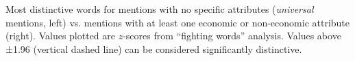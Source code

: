 Most distinctive words for mentions with no specific attributes (\emph{universal} mentions, left) vs. mentions with at least one economic or non-economic attribute (right).  Values plotted are $z$-scores from ``fighting words'' analysis.  Values above ±1.96 (vertical dashed line) can be considered significantly distinctive.